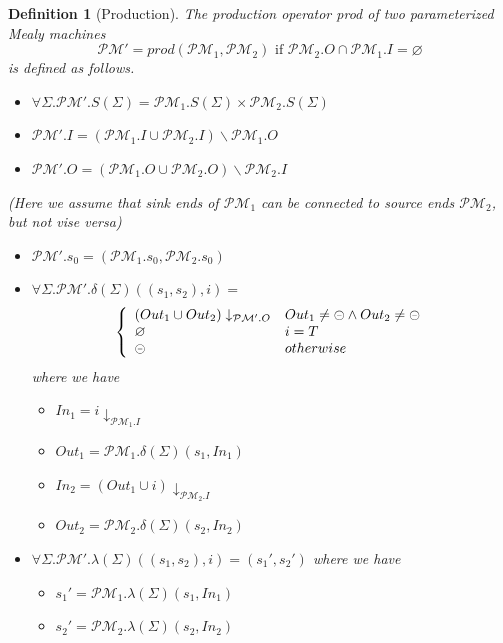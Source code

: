 \documentclass[conference, a4paper]{IEEEtran}
\newtheorem{definition}{Definition}
\newcommand{\rblock}[0]{\circleddash}
\newcommand{\rempty}[0]{\varnothing}
\begin{document}
\begin{definition}[Production]
  The production operator \emph{prod} of two parameterized Mealy machines
  \[
  \mathcal{PM'} = prod(\mathcal{PM}_1,\mathcal{PM}_2)\mbox{ if }\mathcal{PM}_2.O\cap
  \mathcal{PM}_1.I=\varnothing
  \]
  is defined as follows.
  \begin{itemize}
  	\item[-] $\forall\Sigma. \mathcal{PM}'.S(\Sigma)=\mathcal{PM}_1.S(\Sigma)\times \mathcal{PM}_2.S(\Sigma)$
    \item[-] $\mathcal{PM}'.I=(\mathcal{PM}_1.I\cup \mathcal{PM}_2.I)\backslash \mathcal{PM}_1.O$
    \item[-] $\mathcal{PM}'.O=(\mathcal{PM}_1.O\cup \mathcal{PM}_2.O)\backslash \mathcal{PM}_2.I$
  \end{itemize}
  \emph{(Here we assume that sink ends of $\mathcal{PM}_1$ can be connected to source ends $\mathcal{PM}_2$, but not
  vise versa)}
  \begin{itemize}
    \item[-] $\mathcal{PM}'.s_0=(\mathcal{PM}_1.s_0, \mathcal{PM}_2.s_0)$
    \item[-] $\forall\Sigma. \mathcal{PM}'.\delta(\Sigma)((s_1,s_2), i)=$
      \begin{displaymath}
        \left\{
        \begin{array}[ht]{ll}
          (Out_1 \cup Out_2)\downarrow_{\mathcal{PM}'.O} & Out_1\neq\rblock\land Out_2\neq\rblock \\
          \rempty & i = T \\
          \rblock & otherwise \\
        \end{array}
        \right.
      \end{displaymath}
      where we have
      \begin{itemize}
        \item[*] $In_1 = i\downarrow_{\mathcal{PM}_1.I}$
        \item[*] $Out_1 = \mathcal{PM}_1.\delta(\Sigma)(s_1,In_1)$
        \item[*] $In_2 = (Out_1 \cup i)\downarrow_{\mathcal{PM}_2.I}$
        \item[*] $Out_2 = \mathcal{PM}_2.\delta(\Sigma)(s_2,In_2)$
      \end{itemize}
    \item[-] $\forall\Sigma. \mathcal{PM}'. \lambda(\Sigma)((s_1,s_2),i)=(s_1',s_2')$
      where we have
      \begin{itemize}
        \item[*] $s_1' = \mathcal{PM}_1.\lambda(\Sigma)(s_1,In_1)$
        \item[*] $s_2' = \mathcal{PM}_2.\lambda(\Sigma)(s_2,In_2)$
      \end{itemize}
  \end{itemize}
\end{definition}
\end{document}
